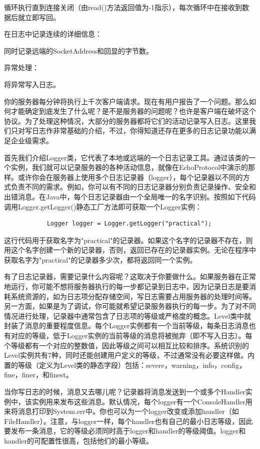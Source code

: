 		循环执行直到连接关闭（由read()方法返回值为-1指示），每次循环中在接收到数据后就立即写回。 

		在日志中记录连续的详细信息： 

		同时记录远端的SocketAddress和回显的字节数。 

		异常处理：

		将异常写入日志。 

		你的服务器每分钟将执行上千次客户端请求。现在有用户报告了一个问题。那么如何才能确定到底发生了什么呢？是不是服务器的问题呢？也许是客户端在破坏这个协议。为了处理这种情况，大部分的服务器都将它们的活动记录写入日志。这里我们只对写日志作非常基础的介绍，不过，你得知道还存在更多的日志记录功能以满足企业级需求。 

		首先我们介绍Logger类，它代表了本地或远端的一个日志记录工具。通过该类的一个实例，我们就可以记录服务器的各种活动信息，就像在EchoProtocol中演示的那样。或许你会在服务器上使用多个日志记录器（logger），每个记录器以不同的方式负责不同的需求。例如，你可以有不同的日志记录器分别负责记录操作、安全和出错消息。在Java中，每个日志记录器由一个全局唯一的名字识别。按照如下代码调用Logger.getLogger()静态工厂方法即可获取一个Logger实例： 

		\begin{verbatim}
			Logger logger = Logger.getLogger("practical"); 
		\end{verbatim}

		这行代码用于获取名字为"practical"的记录器。如果这个名字的记录器不存在，则用这个名字创建一个新的记录器，否则，返回已存在的记录器实例。无论在程序中获取名字为"practical"的记录器多少次，都将返回同一个实例。 

		有了日志记录器，需要记录什么内容呢？这取决于你要做什么。如果服务器在正常地运行，你可能不想将服务器执行的每一步都记录到日志中，因为记录日志是要消耗系统资源的，如为日志项分配存储空间，写日志需要占用服务器的处理时间等。另一方面，如果是为了调试，你可能就希望记录服务器执行的每一步。为了对不同情况进行处理，记录器中通常包含了日志项的等级或严格度的概念。Level类中就封装了消息的重要程度信息。每个Logger实例都有一个当前等级，每条日志消息也有对应的等级，低于Logger实例的当前等级的消息将被抛弃（即不写入日志）。每个等级都有一个对应的整数值，因此等级之间可以相互比较和排序。系统识别的Level实例共有7种，同时还能创建用户定义的等级，不过通常没有必要这样做。内置的等级（定义为Level类的静态字段）包括：severe，warning，info，config，fine，finer，和finest。 

		当你写日志的时候，消息又去哪儿呢？记录器将消息发送到一个或多个Handler实例中，该实例用来发布这些消息。默认情况，每个logger有一个ConsoleHandler用来将消息打印到System.err中。你也可以为一个logger改变或添加handler（如FileHandler）。注意，与logger一样，每个handler也有自己的最小日志等级，因此要发布一条消息，它的等级必须同时高于logger和handler的等级阈值。logger和handler的可配置性很高，包括他们的最小等级。 

